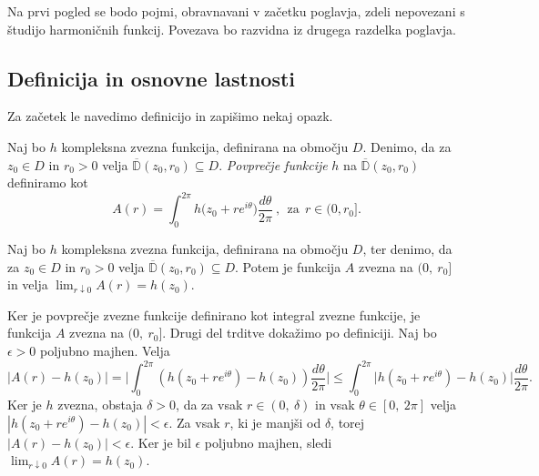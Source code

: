 \documentclass[mat1, tisk]{fmfdelo}
\begin{document}
Na prvi pogled se bodo pojmi, obravnavani v začetku poglavja, zdeli nepovezani s študijo harmoničnih funkcij. Povezava bo razvidna iz drugega razdelka poglavja.

\subsection{Definicija in osnovne lastnosti}

    Za začetek le navedimo definicijo in zapišimo nekaj opazk.

    \begin{definicija}  
        Naj bo $h$ kompleksna zvezna funkcija, definirana na območju $D$. Denimo, da za $z_0 \in D$ in $r_0 > 0$ velja $\overline{\mathbb{D}}(z_0, r_0) \subseteq D$. \emph{Povprečje funkcije} $h$ na $\overline{\mathbb{D}}(z_0, r_0)$ definiramo kot
        $$
            A(r) = \int_{0}^{2 \pi}{h \big(z_0 + r e^{i\theta}\big)\frac{d\theta}{2 \pi}}~,~~\text{za}~~r \in (0,r_0].
        $$
    \end{definicija}
    \begin{trditev}
        \label{zvpov}
        Naj bo $h$ kompleksna zvezna funkcija, definirana na območju $D$, ter denimo, da za $z_0 \in D$ in $r_0 > 0$ velja $\overline{\mathbb{D}}(z_0, r_0) \subseteq D$. 
        Potem je funkcija $A$ zvezna na $(0,~r_0]$ in velja $\lim_{r \downarrow 0}{A(r)} = h(z_0)$.
    \end{trditev}
    \begin{dokaz}
        Ker je povprečje zvezne funkcije definirano kot integral zvezne funkcije, je funkcija $A$ zvezna na $(0,~r_0]$. Drugi del trditve dokažimo po definiciji.
        Naj bo $\epsilon > 0$ poljubno majhen. Velja
        $$
            |A(r) - h(z_0)| = \bigg|\int_{0}^{2\pi} \left(h(z_0 + r e^{i\theta})  - h(z_0)\right) \frac{d\theta}{2\pi} \bigg| \leq \int_{0}^{2 \pi} \big| h(z_0 + r e^{i\theta}) - h(z_0) \big| \frac{d\theta}{2 \pi}.
        $$
        Ker je $h$ zvezna, obstaja $\delta > 0$, da za vsak $r \in  (0,~\delta)$ in vsak $\theta \in [0,~2\pi]$ velja \mbox{$|h(z_0 + r e^{i\theta}) - h(z_0)| < \epsilon$}.
        Za vsak $r$, ki je manjši od $\delta$, torej $|A(r) - h(z_0)| < \epsilon$. Ker je bil $\epsilon$ poljubno majhen, sledi $\lim_{r \downarrow 0}{A(r)} = h(z_0)$.
    \end{dokaz}
\end{document}

